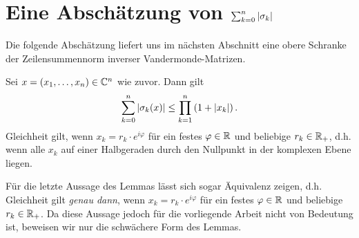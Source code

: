 \section[Abschätzung der Betragssumme der elementarsymmetrischen Polynome]{Eine Abschätzung von \boldmath $\sum_{k=0}^{n} \left\lvert \sigma_{k} \right\rvert$}

Die folgende Abschätzung liefert uns im nächsten Abschnitt eine obere Schranke
der Zeilensummennorm inverser Vandermonde-Matrizen.
\begin{lemma}
    \label{lemma:elementary_symmetric_polynomials_inequality}
    Sei $x = (x_1, \dots, x_n) \in \mathbb{C}^n$ wie zuvor.
    Dann gilt
    \begin{equation}
        \label{eq:elementary_symmetric_polynomials_inequality}
        \sum_{k=0}^{n} \left\lvert \sigma_{k}(x) \right\rvert \leq \prod_{k=1}^{n} \left( 1 + \left\lvert x_k \right\rvert \right).
    \end{equation}
    Gleichheit gilt, wenn $x_k = r_k \cdot e^{i\varphi}$ für ein
    festes $\varphi \in \mathbb{R}$ und beliebige $r_k \in \mathbb{R}_+$,
    d.h. wenn alle $x_k$ auf einer Halbgeraden durch den Nullpunkt
    in der komplexen Ebene liegen.
\end{lemma}

\begin{remark}
    Für die letzte Aussage des Lemmas lässt sich sogar Äquivalenz zeigen, d.h.
    Gleichheit gilt \emph{genau dann}, wenn $x_k = r_k \cdot e^{i\varphi}$ für
    ein festes $\varphi \in \mathbb{R}$ und beliebige $r_k \in \mathbb{R}_+$.
    Da diese Aussage jedoch für die vorliegende Arbeit nicht von Bedeutung ist,
    beweisen wir nur die schwächere Form des Lemmas.
\end{remark}

